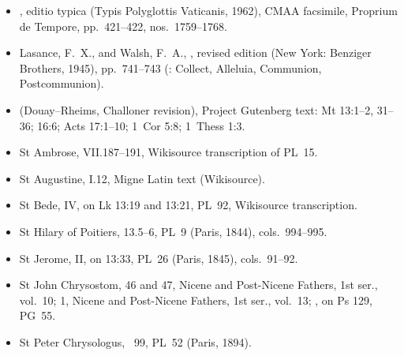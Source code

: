 {\footnotesize
\begin{itemize}\setlength{\itemsep}{0.15em}\setlength{\parskip}{0pt}
\item {}, editio typica (Typis Polyglottis Vaticanis, 1962), CMAA facsimile, Proprium de Tempore, pp.~421--422, nos.~1759--1768.
\item Lasance, F.~X., and Walsh, F.~A., , revised edition (New York: Benziger Brothers, 1945), pp.~741--743 (: Collect, Alleluia, Communion, Postcommunion).
\item {} (Douay--Rheims, Challoner revision), Project Gutenberg text: Mt 13:1--2, 31--36; 16:6; Acts 17:1--10; 1~Cor 5:8; 1~Thess 1:3.
\item St Ambrose,  VII.187--191, Wikisource transcription of PL~15.
\item St Augustine,  I.12, Migne Latin text (Wikisource).
\item St Bede,  IV, on Lk 13:19 and 13:21, PL~92, Wikisource transcription.
\item St Hilary of Poitiers,  13.5--6, PL~9 (Paris, 1844), cols.~994--995.
\item St Jerome,  II, on 13:33, PL~26 (Paris, 1845), cols.~91--92.
\item St John Chrysostom,  46 and 47, Nicene and Post-Nicene Fathers, 1st ser., vol.~10;  1, Nicene and Post-Nicene Fathers, 1st ser., vol.~13; , on Ps 129, PG~55.
\item St Peter Chrysologus, ~99, PL~52 (Paris, 1894).
\end{itemize}
\par}
